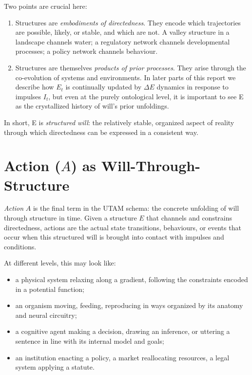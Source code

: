 \documentclass[12pt,a4paper]{report}
\newcommand{\Struct}{E}
\newcommand{\Act}{A}
\begin{document}
Two points are crucial here:

\begin{enumerate}[leftmargin=2em]
    \item Structures are \emph{embodiments of directedness}. They encode which trajectories are possible, likely, or stable, and which are not. A valley structure in a landscape channels water; a regulatory network channels developmental processes; a policy network channels behaviour.
    \item Structures are themselves \emph{products of prior processes}. They arise through the co-evolution of systems and environments. In later parts of this report we describe how \(\Struct_t\) is continually updated by $\Delta \Struct$ dynamics in response to impulses \(I_t\), but even at the purely ontological level, it is important to see \Struct{} as the crystallized history of will’s prior unfoldings.
\end{enumerate}

In short, \Struct{} is \emph{structured will}: the relatively stable, organized aspect of reality through which directedness can be expressed in a consistent way.

\section{Action (\(A\)) as Will-Through-Structure}

\emph{Action} \(\Act\) is the final term in the UTAM schema: the concrete unfolding of will through structure in time. Given a structure \(\Struct\) that channels and constrains directedness, actions are the actual state transitions, behaviours, or events that occur when this structured will is brought into contact with impulses and conditions.

At different levels, this may look like:

\begin{itemize}[leftmargin=2em]
    \item a physical system relaxing along a gradient, following the constraints encoded in a potential function;
    \item an organism moving, feeding, reproducing in ways organized by its anatomy and neural circuitry;
    \item a cognitive agent making a decision, drawing an inference, or uttering a sentence in line with its internal model and goals;
    \item an institution enacting a policy, a market reallocating resources, a legal system applying a statute.
\end{itemize}
\end{document}
